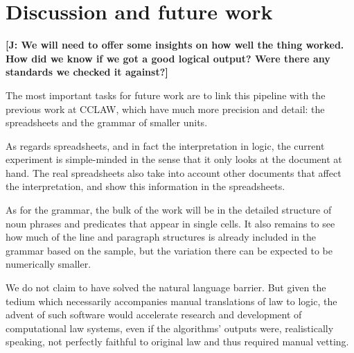 \documentclass{IOS-Book-Article}
\newcommand{\todoj}[1]{{\color{red}\textbf{[J: #1]}}}
\begin{document}
\section{Discussion and future work}
\label{sec:future}

\todoj{ We will need to offer some insights on how well the thing worked. How did we know if we got a good logical output? Were there any standards we checked it against?}

The most important tasks for future work are to link this pipeline with the previous work at CCLAW, which have much more precision and detail: the spreadsheets and the grammar of smaller units.

As regards spreadsheets, and in fact the interpretation in logic, the current experiment is simple-minded in the sense that it only looks at the document at hand.
The real spreadsheets also take into account other documents that affect the interpretation, and show this information in the spreadsheets.

As for the grammar, the bulk of the work will be in the detailed structure of noun phrases and predicates that appear in single cells.
It also remains to see how much of the line and paragraph structures is already included in the grammar based on the sample, but the variation there can be expected to be numerically smaller.

We do not claim to have solved the natural language barrier. But given the tedium which necessarily accompanies manual translations of law to logic, the advent of such software would accelerate research and development of computational law systems, even if the algorithms' outputs were, realistically speaking, not perfectly faithful to original law and thus required manual vetting.



\end{document}
